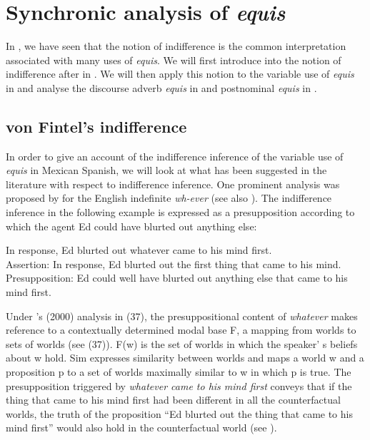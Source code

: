 \documentclass[output=paper
,modfonts
,nonflat]{langsci/langscibook}
\begin{document}
\section{Synchronic analysis of \textit{equis}}\label{sec:kellert:3}
In , we have seen that the notion of indifference is the common interpretation associated with many uses of \textit{equis}. We will first introduce into the notion of indifference after \cite{Fintel2000} in . We will then apply this notion to the variable use of \textit{equis} in  and analyse the discourse adverb \textit{equis} in  and postnominal \textit{equis} in .

\subsection{von Fintel’s indifference}\label{sec:kellert:3.1}
In order to give an account of the indifference inference of the variable use of \textit{equis} in Mexican Spanish, we will look at what has been suggested in the literature with respect to indifference inference. One prominent analysis was proposed by \citep{Fintel2000} for the English indefinite \textit{wh-ever} (see also \citealt{Condoravdi2005}). The indifference inference in the following example is expressed as a presupposition according to which the agent Ed could have blurted out anything else:

\ea In response, Ed blurted out whatever came to his mind first.\\
	Assertion: In response, Ed blurted out the first thing that came to his mind.\\
	Presupposition: Ed could well have blurted out anything else that came to his mind first.
\z

Under \citeauthor{Fintel2000}’s (2000) analysis in (37), the presuppositional content of \textit{whatever} makes reference to a contextually determined modal base F, a mapping from worlds to sets of worlds (see (37)). F(w) is the set of worlds in which the speaker' s beliefs about w hold. Sim expresses similarity between worlds and maps a world w and a proposition p to a set of worlds maximally similar to w in which p is true. The presupposition triggered by \textit{whatever came to his mind first} conveys that if the thing that came to his mind first had been different in all the counterfactual worlds, the truth of the proposition “Ed blurted out the thing that came to his mind first” would also hold in the counterfactual world (see \citealt{Condoravdi2005}).
\end{document}
